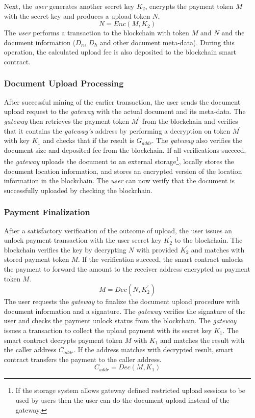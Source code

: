 Next, the {\it user} generates another secret key $K_2$, encrypts the payment token $M$ with the secret key and produces a upload token $N$.
\begin{equation}
\label{eq-u-3}
N = Enc (M, K_2)
\end{equation}
The {\it user} performs a transaction to the blockchain with token $M$ and $N$ and the document information ($D_{n}$, $D_{h}$ and other document meta-data). During this operation, the calculated upload fee is also deposited to the blockchain smart contract.
 
\subsubsection{Document Upload Processing}
After successful mining of the earlier transaction, the user sends the document upload request to the {\it gateway} with the actual document and its meta-data. The {\it gateway} then retrieves the payment token $M^\prime$ from the blockchain and verifies that it contains the {\it gateway's} address by performing a decryption on token $M^\prime$ with key $K_1$ and checks that if the result is $G_{addr}$. The {\it gateway} also verifies the document size and deposited fee from the blockchain. If all verifications succeed, the {\it gateway} uploads the document to an external storage\footnote{If the storage system allows gateway defined restricted upload sessions to be used by users then the user can do the document upload instead of the gateway.}, locally stores the document location information, and stores an encrypted version of the location information in the blockchain. The {\it user} can now verify that the document is successfully uploaded by checking the blockchain. 

\subsubsection{Payment Finalization}
After a satisfactory verification of the outcome of upload, the user issues an unlock payment transaction with the user secret key $K_2^\prime$ to the blockchain. The blockchain verifies the key by decrypting $N$ with provided $K_2^\prime$ and matches with stored payment token $M$. If the verification succeed, the smart contract unlocks the payment to forward the amount to the receiver address encrypted as payment token $M$.
\begin{equation}
\label{eq-u-5}
M = Dec (N, K_2^\prime)
\end{equation}
The user requests the {\it gateway} to finalize the document upload procedure with document information and a signature. The {\it gateway} verifies the signature of the user and checks the payment unlock status from the blockchain. The {\it gateway} issues a transaction to collect the upload payment with its secret key $K_1$. The smart contract decrypts payment token $M$ with $K_1$ and matches the result with the caller address $C_{addr}$. If the address matches with decrypted result, smart contract transfers the payment to the caller  address.
\begin{equation}
\label{eq-u-6}
C_{addr} = Dec (M, K_1)
\end{equation}

